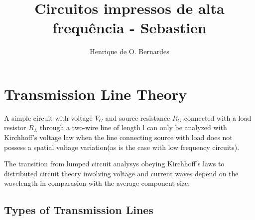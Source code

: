 \documentclass{article}
\begin{document}
\title{Circuitos impressos de alta frequência - Sebastien}
\author{Henrique de O. Bernardes}
\maketitle
\thispagestyle{empty}
\section{Transmission Line Theory}

  A simple circuit with voltage \(V_G\) and source resistance \(R_G\) connected with a load resistor \(R_L\) through a two-wire line of length l can only be analyzed with Kirchhoff's voltage law when the line connecting source with load does not possess a spatial voltage variation(as is the case with low frequency circuits).

The transition from lumped circuit analysys obeying Kirchhoff's laws to distributed circuit theory involving voltage and current waves depend on the wavelength in comparasion with the average component size.

\vspace{5cm}

\subsection{Types of Transmission Lines}
\end{document}
